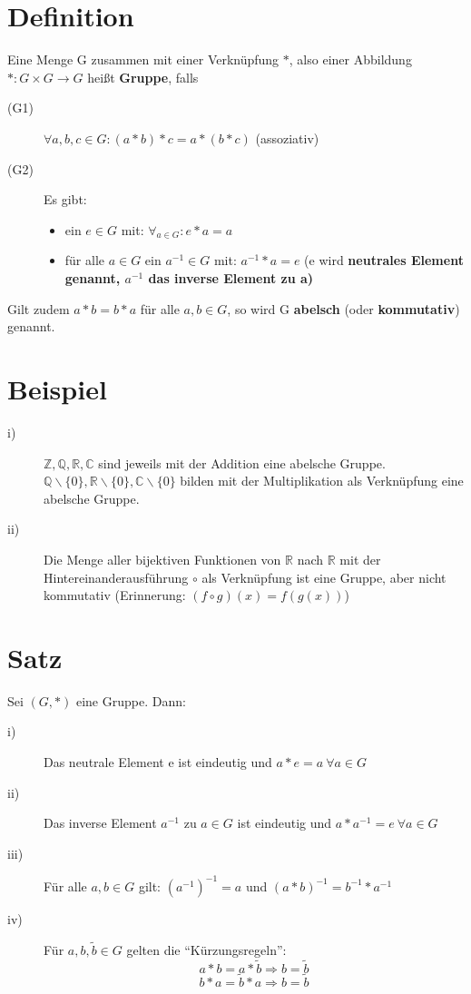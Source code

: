 \documentclass{scrbook}
\begin{document}
\section{Definition}
Eine Menge G zusammen mit einer Verknüpfung \(*\), also einer Abbildung \(*:G\times G \rightarrow G\) heißt \textbf{Gruppe}, falls
\begin{description}
\item[(G1)]\(\forall a,b,c \in G:(a*b)*c=a*(b*c)\)  (assoziativ)
\item[(G2)]Es gibt:
\begin{itemize}
\item ein \(e \in G\) mit: \(\forall_{a\in G}: e*a=a\)
\item für alle \(a\in G\) ein \(a^{-1} \in G\) mit: \(a^{-1}*a=e\) (e wird \textbf{neutrales Element genannt, \(a^{-1} \) das \textbf{inverse Element} zu a)}
\end{itemize}
\end{description}
Gilt zudem \(a*b = b*a\) für alle \(a,b\in G\), so wird G \textbf{abelsch} (oder \textbf{kommutativ}) genannt.
\section{Beispiel}
\begin{description}
\item[i)] \(\mathbb{Z},\mathbb{Q},\mathbb{R},\mathbb{C}\) sind jeweils mit der Addition eine abelsche Gruppe.\(\mathbb{Q}\backslash \{0\},\mathbb{R}\backslash \{0\},\mathbb{C}\backslash \{0\}\) bilden mit der Multiplikation als Verknüpfung eine abelsche Gruppe.
\item[ii)] Die Menge aller bijektiven Funktionen von \(\mathbb{R}\) nach \( \mathbb{R}\) mit der Hintereinanderausführung \(\circ\) als Verknüpfung ist eine Gruppe, aber nicht kommutativ (Erinnerung: \((f\circ g)(x) = f(g(x))\))
\end{description}
\section{Satz}
Sei \((G,*)\) eine Gruppe. Dann:
\begin{description}
\item[i)] Das neutrale Element e ist eindeutig und \(a*e=a \ \forall a \in G\)
\item[ii)] Das inverse Element \(a^{-1}\) zu \(a \in G\) ist eindeutig und \(a*a^{-1} = e \ \forall a\in G\)
\item[iii)] Für alle \(a,b \in G\) gilt: \((a^{-1})^{-1} = a\) und \((a*b)^{-1}=b^{-1} * a^{-1}\)
\item[iv)]Für \(a,b,\tilde{b} \in G \) gelten die "`Kürzungsregeln"':
\[
a*b = a*\tilde{b}\Rightarrow b=\tilde{b}
\]
\[
b*a = \tilde{b} * a \Rightarrow b= \tilde{b}\]
\end{description}
\end{document}
